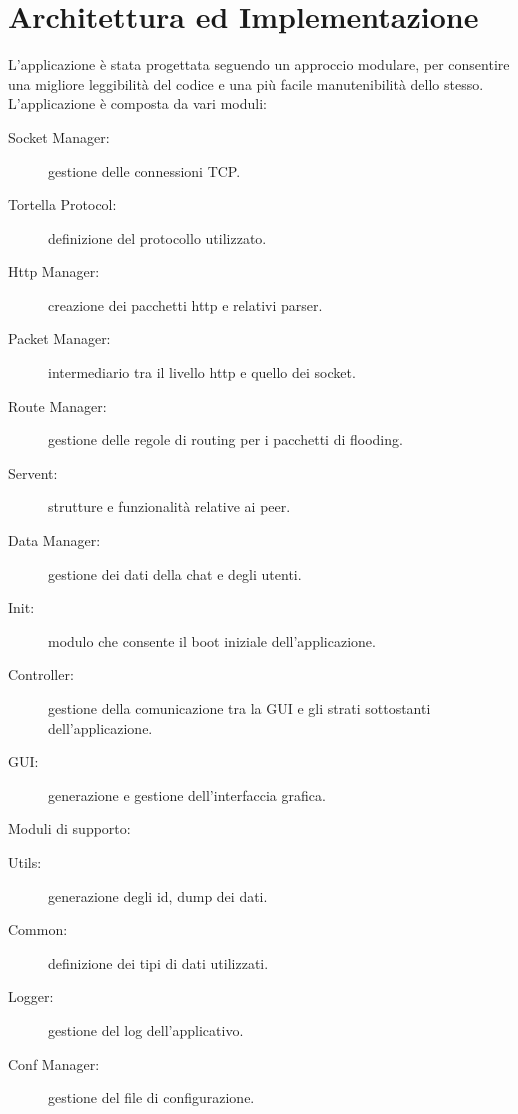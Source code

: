 \chapter{Architettura ed Implementazione}\label{architettura}
L'applicazione è stata progettata seguendo un approccio modulare, per consentire una migliore leggibilità del codice e una più facile manutenibilità dello stesso. L'applicazione è composta da vari moduli:
\begin{description}
\item[Socket Manager:] gestione delle connessioni TCP.
\item[Tortella Protocol:] definizione del protocollo utilizzato.
\item[Http Manager:] creazione dei pacchetti http e relativi parser.
\item[Packet Manager:] intermediario tra il livello http e quello dei socket.
\item[Route Manager:] gestione delle regole di routing per i pacchetti di flooding.
\item[Servent:] strutture e funzionalità relative ai peer.
\item[Data Manager:] gestione dei dati della chat e degli utenti.
\item[Init:] modulo che consente il boot iniziale dell'applicazione.
\item[Controller:] gestione della comunicazione tra la GUI e gli strati sottostanti dell'applicazione.
\item[GUI:] generazione e gestione dell'interfaccia grafica.
\end{description}
Moduli di supporto:
\begin{description}	
\item[Utils:] generazione degli id, dump dei dati. 
\item[Common:] definizione dei tipi di dati utilizzati.
\item[Logger:] gestione del log dell'applicativo.
\item[Conf Manager:] gestione del file di configurazione.
\end{description}
